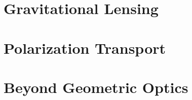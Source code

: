 \section{Gravitational Lensing}\label{sec:gravitational-lensing}

\section{Polarization Transport\optmark}\label{sec:polarization-transport}

\section{Beyond Geometric Optics\mentionmark}\label{sec:beyond-geometric-optics}
